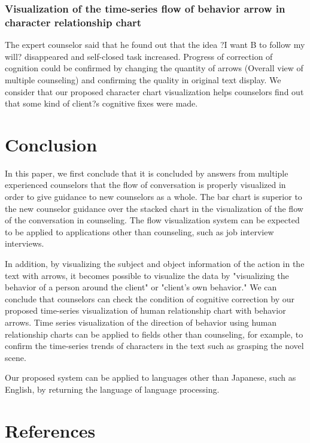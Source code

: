 \documentclass[review]{elsarticle}
\begin{document}
\subsubsection{Visualization of the time-series flow of behavior arrow in character relationship chart}

  The expert counselor said that he found out that the idea ?I want B to follow my will? disappeared and self-closed task increased. Progress of correction of cognition could be confirmed by changing the quantity of arrows (Overall view of multiple counseling) and confirming the quality in original text display. We consider that our proposed character chart visualization helps counselors find out that some kind of client?s cognitive fixes were made.

\section{Conclusion}

  In this paper, we first conclude that it is concluded by answers from multiple experienced counselors that the flow of conversation is properly visualized in order to give guidance to new counselors as a whole.  The bar chart is superior to the new counselor guidance over the stacked chart in the visualization of the flow of the conversation in counseling. The flow visualization system can be expected to be applied to applications other than counseling, such as job interview interviews.

  In addition, by visualizing the subject and object information of the action in the text with arrows, it becomes possible to visualize the data by "visualizing the behavior of a person around the client" or "client's own behavior." We can conclude that counselors can check the condition of cognitive correction by our proposed time-series visualization of human relationship chart with behavior arrows. Time series visualization of the direction of behavior using human relationship charts can be applied to fields other than counseling, for example, to confirm the time-series trends of characters in the text such as grasping the novel scene. 

    Our proposed system can be applied to languages other than Japanese, such as English, by returning the language of language processing.




\section*{References}


\end{document}
